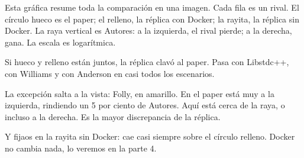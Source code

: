 Esta gráfica resume toda la comparación en una imagen. Cada fila es un rival. El círculo hueco es el paper; el relleno, la réplica con Docker; la rayita, la réplica sin Docker. La raya vertical es Autores: a la izquierda, el rival pierde; a la derecha, gana. La escala es logarítmica.

Si hueco y relleno están juntos, la réplica clavó al paper. Pasa con Libstdc++, con Williams y con Anderson en casi todos los escenarios.

La excepción salta a la vista: Folly, en amarillo. En el paper está muy a la izquierda, rindiendo un 5 por ciento de Autores. Aquí está cerca de la raya, o incluso a la derecha. Es la mayor discrepancia de la réplica.

Y fijaos en la rayita sin Docker: cae casi siempre sobre el círculo relleno. Docker no cambia nada, lo veremos en la parte 4.
